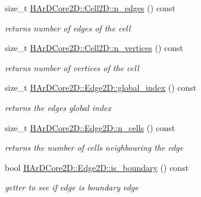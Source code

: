 \begin{DoxyCompactItemize}
\mbox{\label{group__Mesh2D_ga75aafeb4e614e1cfeb1ffb916a69914f}} 
size\+\_\+t \hyperlink{group__Mesh2D_ga75aafeb4e614e1cfeb1ffb916a69914f}{H\+Ar\+D\+Core2\+D\+::\+Cell2\+D\+::n\+\_\+edges} () const
\begin{DoxyCompactList}\small\item\em returns number of edges of the cell \end{DoxyCompactList}\item 
\mbox{\label{group__Mesh2D_gabf4709ed50e4797691a5124d625e6436}} 
size\+\_\+t \hyperlink{group__Mesh2D_gabf4709ed50e4797691a5124d625e6436}{H\+Ar\+D\+Core2\+D\+::\+Cell2\+D\+::n\+\_\+vertices} () const
\begin{DoxyCompactList}\small\item\em returns number of vertices of the cell \end{DoxyCompactList}\item 
\mbox{\label{group__Mesh2D_gaf8f93876f28049fbc97eccf27af2ccce}} 
size\+\_\+t \hyperlink{group__Mesh2D_gaf8f93876f28049fbc97eccf27af2ccce}{H\+Ar\+D\+Core2\+D\+::\+Edge2\+D\+::global\+\_\+index} () const
\begin{DoxyCompactList}\small\item\em returns the edges global index \end{DoxyCompactList}\item 
\mbox{\label{group__Mesh2D_ga99dda0dc4b6b35518d701a59a4a18bd5}} 
size\+\_\+t \hyperlink{group__Mesh2D_ga99dda0dc4b6b35518d701a59a4a18bd5}{H\+Ar\+D\+Core2\+D\+::\+Edge2\+D\+::n\+\_\+cells} () const
\begin{DoxyCompactList}\small\item\em returns the number of cells neighbouring the edge \end{DoxyCompactList}\item 
\mbox{\label{group__Mesh2D_ga9a012ccc3edb2b93501ed25fe8852141}} 
bool \hyperlink{group__Mesh2D_ga9a012ccc3edb2b93501ed25fe8852141}{H\+Ar\+D\+Core2\+D\+::\+Edge2\+D\+::is\+\_\+boundary} () const
\begin{DoxyCompactList}\small\item\em getter to see if edge is boundary edge \end{DoxyCompactList}\item 

\end{DoxyCompactItemize}
